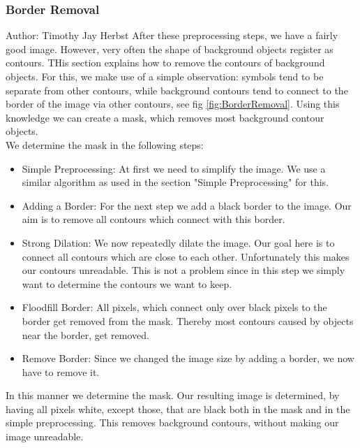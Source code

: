 \documentclass[11pt]{article}
\begin{document}
	\subsubsection{Border Removal}%
		\small{Author: Timothy Jay Herbst} \newline \newline
		After these preprocessing steps, we have a fairly good image.
		However, very often the shape of background objects register as contours.
		THis section explains how to remove the contours of background objects.
		For this, we make use of a simple observation: symbols tend to be separate from other contours, while background contours tend to connect to the border of the image via other contours, see fig \ref{fig:BorderRemoval}.
		Using this knowledge we can create a mask, which removes most background contour objects.\\
		We determine the mask in the following steps:
		\begin{itemize}
			\item Simple Preprocessing: At first we need to simplify the image. We use a similar algorithm as used in the section "Simple Preprocessing" for this.
			\item Adding a Border: For the next step we add a black border to the image. Our aim is to remove all contours which connect with this border.
			\item Strong Dilation: We now repeatedly dilate the image. Our goal here is to connect all contours which are close to each other.
			Unfortunately this makes our contours unreadable.
			This is not a problem since in this step we simply want to determine the contours we want to keep.
			\item Floodfill Border: All pixels, which connect only over black pixels to the border get removed from the mask.
			Thereby most contours caused by objects near the border, get removed.
			\item Remove Border: Since we changed the image size by adding a border, we now have to remove it.
		\end{itemize}
		In this manner we determine the mask.
		Our resulting image is determined, by having all pixels white, except those, that are black both in the mask and in the simple preprocessing.
		This removes background contours, without making our image unreadable.
\end{document}
